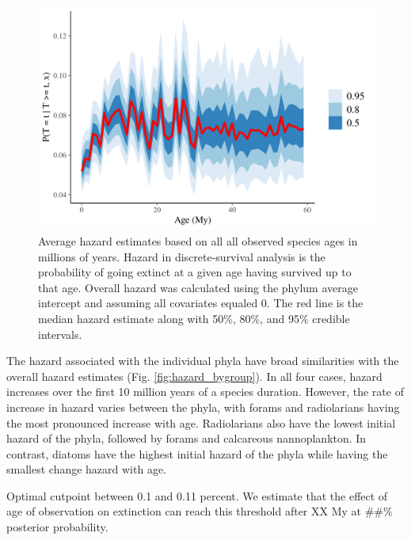 \documentclass[12pt,letterpaper]{article}
\begin{document}
\begin{figure}[ht]
  \centering
  \includegraphics[width=\textwidth,height=0.5\textheight,keepaspectratio=true]{figure/hazard_baseline}
  \caption{Average hazard estimates based on all all observed species ages in millions of years. Hazard in discrete-survival analysis is the probability of going extinct at a given age having survived up to that age. Overall hazard was calculated using the phylum average intercept and assuming all covariates equaled 0. The red line is the median hazard estimate along with 50\%, 80\%, and 95\% credible intervals.}
  \label{fig:hazard_baseline}
\end{figure}

The hazard associated with the individual phyla have broad similarities with the overall hazard estimates (Fig. \ref{fig:hazard_bygroup}). In all four cases, hazard increases over the first 10 million years of a species duration. However, the rate of increase in hazard varies between the phyla, with forams and radiolarians having the most pronounced increase with age. Radiolarians also have the lowest initial hazard of the phyla, followed by forams and calcareous nannoplankton. In contrast, diatoms have the highest initial hazard of the phyla while having the smallest change hazard with age. 

Optimal cutpoint between 0.1 and 0.11 percent. We estimate that the effect of age of observation on extinction can reach this threshold after XX My at ##\% posterior probability.
\end{document}
